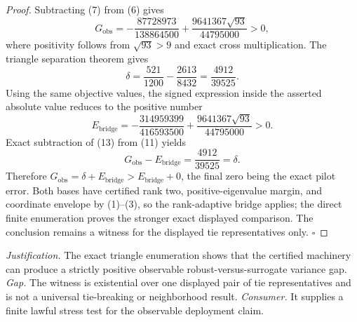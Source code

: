 \documentclass{article}
\begin{document}
\begin{proof}
Subtracting (7) from (6) gives
\[
G_{\mathrm{obs}}
=-\frac{87728973}{138864500}
+\frac{9641367\sqrt{93}}{44795000}>0,
\tag{11}
\]
where positivity follows from \(\sqrt{93}>9\) and exact cross multiplication.  The triangle separation theorem gives
\[
\delta=\frac{521}{1200}-\frac{2613}{8432}
=\frac{4912}{39525}.
\tag{12}
\]
Using the same objective values, the signed expression inside the asserted absolute value reduces to the positive number
\[
E_{\mathrm{bridge}}
=-\frac{314959399}{416593500}
+\frac{9641367\sqrt{93}}{44795000}>0.
\tag{13}
\]
Exact subtraction of (13) from (11) yields
\[
G_{\mathrm{obs}}-E_{\mathrm{bridge}}
=\frac{4912}{39525}=\delta.
\tag{14}
\]
Therefore \(G_{\mathrm{obs}}=\delta+E_{\mathrm{bridge}}>E_{\mathrm{bridge}}+0\), the final zero being the exact pilot error.  Both bases have certified rank two, positive-eigenvalue margin, and coordinate envelope by (1)--(3), so the rank-adaptive bridge applies; the direct finite enumeration proves the stronger exact displayed comparison.  The conclusion remains a witness for the displayed tie representatives only. \(\square\)
\end{proof}
\par\smallskip\noindent \textit{Justification.} The exact triangle enumeration shows that the certified machinery can produce a strictly positive observable robust-versus-surrogate variance gap. \textit{Gap.} The witness is existential over one displayed pair of tie representatives and is not a universal tie-breaking or neighborhood result. \textit{Consumer.} It supplies a finite lawful stress test for the observable deployment claim.
\end{document}
